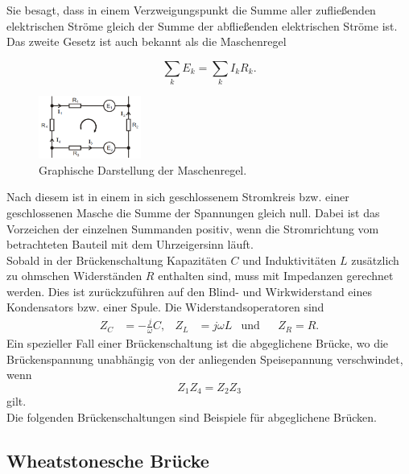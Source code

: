 \noindent Sie besagt, dass in einem Verzweigungspunkt die Summe aller zufließenden elektrischen Ströme gleich der Summe der abfließenden elektrischen Ströme ist.\\ 
\noindent Das zweite Gesetz ist auch bekannt als die Maschenregel

\begin{equation}
    \sum_k E_k = \sum_k I_k R_k.
    \label{eqn:masche}
\end{equation}

\begin{figure}[H]
    \centering
    \includegraphics[width=0.3\textwidth]{build/maschen.PNG}
    \caption{Graphische Darstellung der Maschenregel.\cite[217]{V302}}
    \label{fig:maschen}
\end{figure}

\noindent Nach diesem ist in einem in sich geschlossenem Stromkreis bzw. einer geschlossenen Masche die Summe der Spannungen gleich null. 
Dabei ist das Vorzeichen der einzelnen Summanden positiv, wenn die Stromrichtung vom betrachteten Bauteil mit dem Uhrzeigersinn läuft.\\
Sobald in der Brückenschaltung Kapazitäten $C$ und Induktivitäten $L$ zusätzlich zu ohmschen Widerständen $R$ enthalten sind, muss mit Impedanzen gerechnet werden.
Dies ist zurückzuführen auf den Blind- und Wirkwiderstand eines Kondensators bzw. einer Spule.
Die Widerstandsoperatoren sind 
\begin{align}
    Z_C &= -\frac{j}{\omega} C , & Z_L &= j\omega L  &\text{und}& &Z_R = R .
    \label{eqn:operatoren}
\end{align}
Ein spezieller Fall einer Brückenschaltung ist die abgeglichene Brücke, wo die Brückenspannung unabhängig von der anliegenden Speisepannung verschwindet, wenn 
\begin{equation}
    Z_1 Z_4 = Z_2 Z_3
    \label{eqn:abgleichbed}
\end{equation}
gilt.\\
Die folgenden Brückenschaltungen sind Beispiele für abgeglichene Brücken.

\subsection{Wheatstonesche Brücke}
\label{subsec:wheatstone}

